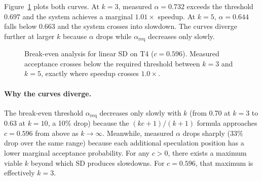 \documentclass[letterpaper,twocolumn,10pt]{article}
\begin{document}
Figure~\ref{fig:breakeven} plots both curves.
At $k{=}3$, measured $\alpha = 0.732$ exceeds the threshold $0.697$ and the system achieves a marginal $1.01\times$ speedup.
At $k{=}5$, $\alpha = 0.644$ falls below $0.663$ and the system crosses into slowdown.
The curves diverge further at larger $k$ because $\alpha$ drops while $\alpha_{\text{req}}$ decreases only slowly.

\begin{figure}[t]
\centering
{}
\caption{Break-even analysis for linear SD on T4 ($c = 0.596$). Measured acceptance crosses below the required threshold between $k{=}3$ and $k{=}5$, exactly where speedup crosses $1.0\times$.}
\label{fig:breakeven}
\end{figure}

\paragraph{Why the curves diverge.}
The break-even threshold $\alpha_{\text{req}}$ decreases only slowly with $k$ (from 0.70 at $k{=}3$ to 0.63 at $k{=}10$, a 10\% drop) because the $(kc + 1)/(k + 1)$ formula approaches $c = 0.596$ from above as $k \to \infty$.
Meanwhile, measured $\alpha$ drops sharply (33\% drop over the same range) because each additional speculation position has a lower marginal acceptance probability.
For any $c > 0$, there exists a maximum viable $k$ beyond which SD produces slowdowns.
For $c = 0.596$, that maximum is effectively $k = 3$.
\end{document}
